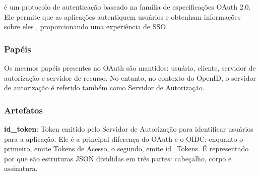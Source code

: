  é um protocolo de autenticação baseado na família de especificações OAuth 2.0. Ele permite que as aplicações autentiquem usuários e obtenham informações sobre eles \cite{openid}, proporcionando uma experiência de \acs{SSO}.

\subsubsection{Papéis}\label{subsubsec:papeis-artefatos-oidc}

Os mesmos papéis presentes no OAuth são mantidos: usuário, cliente, servidor de autorização e servidor de recurso. No entanto, no contexto do OpenID, o servidor de autorização é referido também como Servidor de Autorização.

\subsubsection{Artefatos}\label{subsubsec:artefato-oidc}

\textbf{id\_token}: Token emitido pelo Servidor de Autorização para identificar usuários para a aplicação. Ele é a principal diferença do OAuth e o OIDC: enquanto o primeiro, emite Tokens de Acesso, o segundo, emite id\_Tokens. É representado por   que são estruturas JSON divididas em três partes: cabeçalho, corpo e assinatura. 

